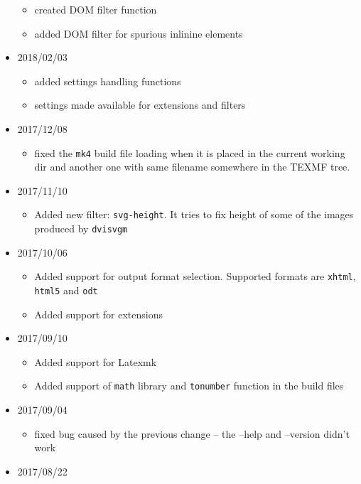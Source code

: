 \begin{itemize}
  \begin{itemize}
  \tightlist
  \item
    created DOM filter function
  \item
    added DOM filter for spurious inlinine elements
  \end{itemize}
\item
  2018/02/03

  \begin{itemize}
  \tightlist
  \item
    added settings handling functions
  \item
    settings made available for extensions and filters
  \end{itemize}
\item
  2017/12/08

  \begin{itemize}
  \tightlist
  \item
    fixed the \texttt{mk4} build file loading when it is placed in the
    current working dir and another one with same filename somewhere in
    the TEXMF tree.
  \end{itemize}
\item
  2017/11/10

  \begin{itemize}
  \tightlist
  \item
    Added new filter: \texttt{svg-height}. It tries to fix height of
    some of the images produced by \texttt{dvisvgm}
  \end{itemize}
\item
  2017/10/06

  \begin{itemize}
  \tightlist
  \item
    Added support for output format selection. Supported formats are
    \texttt{xhtml}, \texttt{html5} and \texttt{odt}
  \item
    Added support for extensions
  \end{itemize}
\item
  2017/09/10

  \begin{itemize}
  \tightlist
  \item
    Added support for Latexmk
  \item
    Added support of \texttt{math} library and \texttt{tonumber}
    function in the build files
  \end{itemize}
\item
  2017/09/04

  \begin{itemize}
  \tightlist
  \item
    fixed bug caused by the previous change -- the --help and --version
    didn't work
  \end{itemize}
\item
  2017/08/22


\end{itemize}
